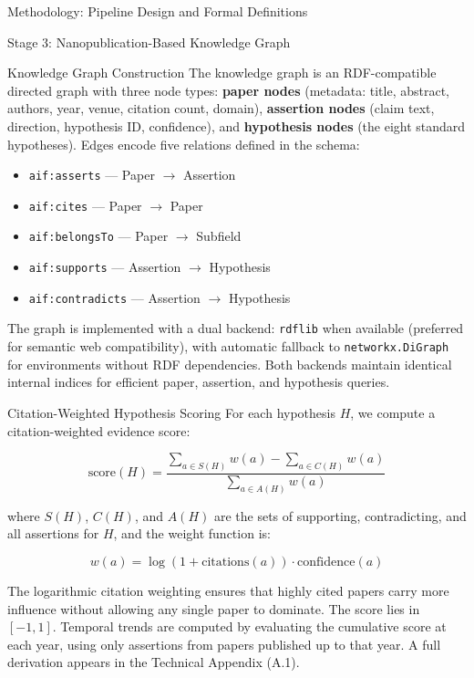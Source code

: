 \documentclass[
  ignorenonframetext,
]{beamer}
\providecommand{\tightlist}{%
  \setlength{\itemsep}{0pt}\setlength{\parskip}{0pt}}
\begin{document}
\begin{frame}[fragile]{Methodology: Pipeline Design and Formal
Definitions}
\begin{block}{Stage 3: Nanopublication-Based Knowledge Graph}
\begin{block}{Knowledge Graph Construction}
\protect{}\label{knowledge-graph-construction}
The knowledge graph is an RDF-compatible directed graph with three node
types: \textbf{paper nodes} (metadata: title, abstract, authors, year,
venue, citation count, domain), \textbf{assertion nodes} (claim text,
direction, hypothesis ID, confidence), and \textbf{hypothesis nodes}
(the eight standard hypotheses). Edges encode five relations defined in
the schema:

\begin{itemize}
\tightlist
\item
  \texttt{aif:asserts} --- Paper \(\to\) Assertion
\item
  \texttt{aif:cites} --- Paper \(\to\) Paper
\item
  \texttt{aif:belongsTo} --- Paper \(\to\) Subfield
\item
  \texttt{aif:supports} --- Assertion \(\to\) Hypothesis
\item
  \texttt{aif:contradicts} --- Assertion \(\to\) Hypothesis
\end{itemize}

The graph is implemented with a dual backend: \texttt{rdflib}
\citep{rdflib2023} when available (preferred for semantic web
compatibility), with automatic fallback to \texttt{networkx.DiGraph} for
environments without RDF dependencies. Both backends maintain identical
internal indices for efficient paper, assertion, and hypothesis queries.
\end{block}

\begin{block}{Citation-Weighted Hypothesis Scoring}
\protect{}\label{citation-weighted-hypothesis-scoring}
For each hypothesis \(H\), we compute a citation-weighted evidence
score:

\[
\text{score}(H) = \frac{\sum_{a \in S(H)} w(a) - \sum_{a \in C(H)} w(a)}{\sum_{a \in A(H)} w(a)}
\]

where \(S(H)\), \(C(H)\), and \(A(H)\) are the sets of supporting,
contradicting, and all assertions for \(H\), and the weight function is:

\[
w(a) = \log(1 + \text{citations}(a)) \cdot \text{confidence}(a)
\]

The logarithmic citation weighting ensures that highly cited papers
carry more influence without allowing any single paper to dominate. The
score lies in \([-1, 1]\). Temporal trends are computed by evaluating
the cumulative score at each year, using only assertions from papers
published up to that year. A full derivation appears in the Technical
Appendix (A.1).
\end{block}


\end{block}
\end{frame}
\end{document}
